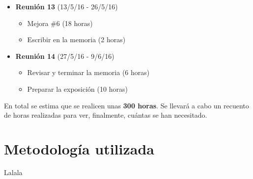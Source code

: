 \begin{itemize}
	\item \textbf{Reunión 13} (13/5/16 - 26/5/16)
	\begin{itemize}
		\item Mejora \#6 (18 horas)
		\item Escribir en la memoria (2 horas)
	\end{itemize}
	
	\item \textbf{Reunión 14} (27/5/16 - 9/6/16)
	\begin{itemize}
		\item Revisar y terminar la memoria (6 horas)
		\item Preparar la exposición (10 horas)
	\end{itemize}
\end{itemize}

En total se estima que se realicen unas \textbf{300 horas}. Se llevará a cabo un recuento de horas realizadas para ver, finalmente, cuántas se han necesitado.

\section{Metodología utilizada}

Lalala